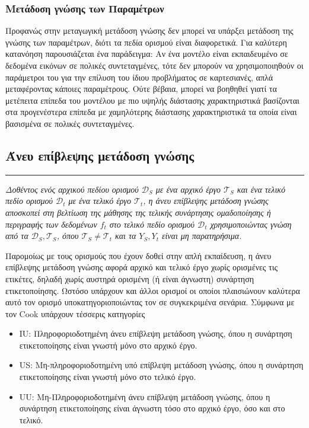 \subsubsection{Μετάδοση γνώσης των Παραμέτρων}
Προφανώς στην μεταγωγική μετάδοση γνώσης δεν μπορεί να υπάρξει μετάδοση της γνώσης των παραμέτρων, διότι τα πεδία ορισμού είναι διαφορετικά. Για καλύτερη κατανόηση παρουσιάζεται ένα παράδειγμα: Αν ένα μοντέλο είναι εκπαιδευμένο σε δεδομένα εικόνων σε πολικές συντεταγμένες, τότε δεν μπορούν να χρησιμοποιηθούν οι παράμετροι του για την επίλυση του ίδιου προβλήματος σε καρτεσιανές, απλά μεταφέροντας κάποιες παραμέτρους. Ούτε βέβαια, μπορεί να βοηθηθεί γιατί τα μετέπειτα επίπεδα του μοντέλου με πιο υψηλής διάστασης χαρακτηριστικά βασίζονται στα προγενέστερα επίπεδα με χαμηλότερης διάστασης χαρακτηριστικά τα οποία είναι βασισμένα σε πολικές συντεταγμένες.

\subsection{Άνευ επίβλεψης μετάδοση γνώσης}
{ \rule{1ex}{1ex} }%
\textit{Δοθέντος ενός αρχικού πεδίου ορισμού $\mathcal{D}_S$ με ένα αρχικό έργο $\mathcal{T}_S$ και ένα τελικό πεδίο ορισμού $\mathcal{D}_t$ με ένα τελικό έργο $\mathcal{T}_t$, η άνευ επίβλεψης μετάδοση γνώσης αποσκοπεί στη βελτίωση της μάθησης της τελικής συνάρτησης ομαδοποίησης ή περιγραφής των δεδομένων $f_t$ στο τελικό πεδίο ορισμού $\mathcal{D}_t$ χρησιμοποιώντας γνώση από τα $\mathcal{D}_S, \mathcal{T}_S$, όπου $\mathcal{T}_S \neq \mathcal{T}_t$ και τα $Y_S, Y_t$ είναι μη παρατηρήσιμα.}

Παρομοίως με τους ορισμούς που έχουν δοθεί στην απλή εκπαίδευση, η άνευ επίβλεψης μετάδοση γνώσης αφορά αρχικό και τελικό έργο χωρίς ορισμένες τις ετικέτες, δηλαδή χωρίς αυστηρά ορισμένη (ή είναι άγνωστη) συνάρτηση ετικετοποίησης. Ωστόσο υπάρχουν και άλλοι ορισμοί οι οποίοι πλαισιώνουν καλύτερα αυτό τον ορισμό υποκατηγοριοποιώντας τον σε συγκεκριμένα σενάρια. Σύμφωνα με τον Cook \cite{44} υπάρχουν τέσσερις κατηγορίες 
\begin{itemize}
    \item IU: Πληροφοριοδοτημένη άνευ επίβλεψη μετάδοση γνώσης, όπου η συνάρτηση ετικετοποίησης είναι γνωστή μόνο στο αρχικό έργο.
    \item US: Μη-πληροφοριοδοτημένη υπό επίβλεψη μετάδοση γνώσης, όπου η συνάρτηση ετικετοποίησης είναι γνωστή μόνο στο τελικό έργο.
    \item UU: Μη-Πληροφοριοδοτημένη άνευ επίβλεψη μετάδοση γνώσης, όπου η συνάρτηση ετικετοποίησης είναι άγνωστη τόσο στο αρχικό έργο, όσο και στο τελικό.
\end{itemize}


